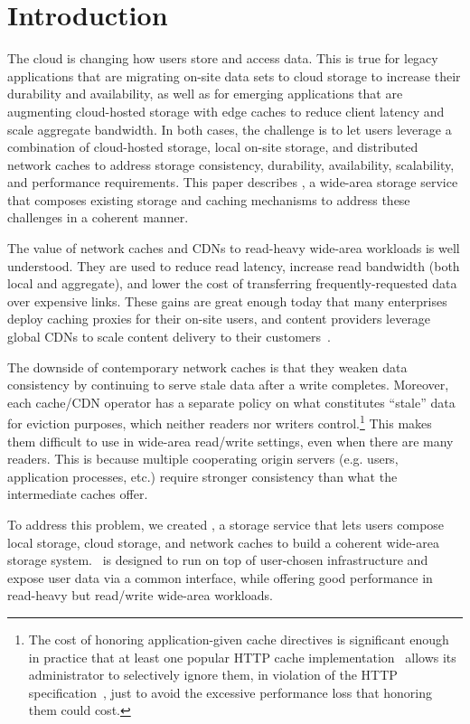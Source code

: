\section{Introduction}
\label{sec:introduction}

The cloud is changing how users store and access data. This is true for legacy applications that are migrating on-site data sets to cloud storage to increase their durability and availability, as well as for emerging applications that are augmenting cloud-hosted storage with edge caches to reduce client latency and scale aggregate bandwidth. In both cases, the challenge is to let users leverage a combination of cloud-hosted storage, local on-site storage, and distributed network caches to address storage consistency, durability, availability, scalability, and performance requirements. This paper describes \Syndicate, a wide-area storage service that composes existing storage and caching mechanisms to address these challenges in a coherent manner.

The value of network caches and CDNs to read-heavy wide-area workloads is well understood. They are used to reduce read latency, increase read bandwidth (both local and aggregate), and lower the cost of transferring frequently-requested data over expensive links. These gains are great enough today that many enterprises deploy caching proxies for their on-site users, and content providers leverage global CDNs to scale content delivery to their customers~\cite{Akamai, coralcdn, coblitz}.

The downside of contemporary network caches is that they weaken data consistency by continuing to serve stale data after a write completes. Moreover, each cache/CDN operator has a separate policy on what constitutes ``stale'' data for eviction purposes, which neither readers nor writers control.\footnote{The cost of honoring application-given cache directives is significant enough in practice that at least one popular HTTP cache implementation~\cite{Squid} allows its administrator to selectively ignore them, in violation of the HTTP specification~\cite{HTTP-RFC}, just to avoid the excessive performance loss that honoring them could cost.} This makes them difficult to use in wide-area read/write settings, even when there are many readers. This is because multiple cooperating origin servers (e.g. users, application processes, etc.) require stronger consistency than what the intermediate caches offer.

To address this problem, we created \Syndicate, a storage service that lets users compose local storage, cloud storage, and network caches to build a coherent wide-area storage system. \Syndicate\ is designed to run on top of user-chosen infrastructure and expose user data via a common interface, while offering good performance in read-heavy but read/write wide-area workloads.

